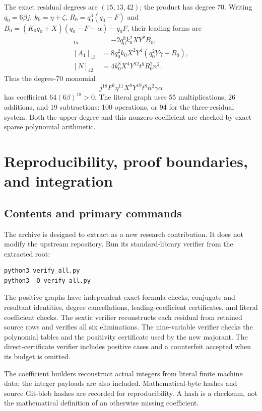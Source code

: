\documentclass[11pt]{article}
\theoremstyle{definition}
\theoremstyle{remark}
\begin{document}
The exact residual degrees are $(15,13,42)$; the product has degree 70.
Writing $q_0=6\beta j$, $k_0=\eta+\zeta$,
$R_0=q_0^3(q_0-F)$ and
$B_0=(K_0q_0+X)(q_0-F-\alpha)-q_0F$, their leading forms are
\begin{align*}
 [A_0]_{15}&=-2q_0^8k_0^2XY^2B_0,\\
 [A_1]_{13}&=8q_0^2k_0X^2Y^4(q_0^2Y\gamma+R_0),\\
 [N]_{42}&=4k_0^8X^4Y^{12}t^8R_0^2n^2.
\end{align*}
Thus the degree-70 monomial
\[
 j^{18}F^2\eta^{11}X^8Y^{19}t^8n^2\gamma\alpha
\]
has coefficient $64(6\beta)^{18}>0$. The literal graph uses 55
multiplications, 26 additions, and 19 subtractions: 100 operations, or
94 for the three-residual system. Both the upper degree and this nonzero
coefficient are checked by exact sparse polynomial arithmetic.







\section{Reproducibility, proof boundaries, and integration}

\subsection{Contents and primary commands}

The archive is designed to extract as a new research contribution. It does
not modify the upstream repository. Run its standard-library verifier from
the extracted root:
\begin{lstlisting}
python3 verify_all.py
python3 -O verify_all.py
\end{lstlisting}
The positive graphs have independent exact formula checks, conjugate and
resultant identities, degree cancellations, leading-coefficient certificates,
and literal coefficient checks. The sextic verifier reconstructs each
residual from retained source rows and verifies all six eliminations. The
nine-variable verifier checks the polynomial tables and the positivity
certificate used by the new majorant. The direct-certificate verifier
includes positive cases and a counterfeit accepted when its budget is omitted.

The coefficient builders reconstruct actual integers from literal finite
machine data; the integer payloads are also included. Mathematical-byte
hashes and source Git-blob hashes are recorded for reproducibility. A hash
is a checksum, not the mathematical definition of an otherwise missing
coefficient.
\end{document}
